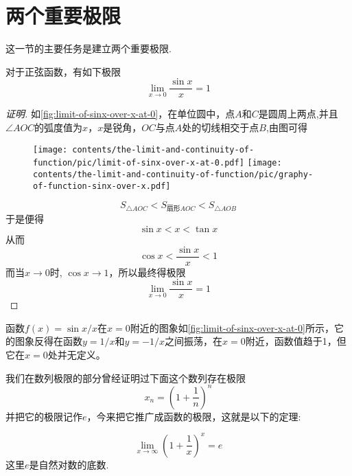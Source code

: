 
\section{两个重要极限}
\label{sec:two-import-function-limit}

这一节的主要任务是建立两个重要极限.

\begin{theorem}
  对于正弦函数，有如下极限
  \[ \lim_{x \to 0} \frac{\sin{x}}{x} = 1 \]
\end{theorem}

\begin{proof}[证明]

  如\autoref{fig:limit-of-sinx-over-x-at-0}，在单位圆中，点$A$和$C$是圆周上两点,并且$\angle AOC$的弧度值为$x$，$x$是锐角，$OC$与点$A$处的切线相交于点$B$,由图可得
  
\begin{figure}[htbp]
\centering
\texttt{[image: contents/the-limit-and-continuity-of-function/pic/limit-of-sinx-over-x-at-0.pdf]}
\texttt{[image: contents/the-limit-and-continuity-of-function/pic/graphy-of-function-sinx-over-x.pdf]}
\caption{}
\label{fig:limit-of-sinx-over-x-at-0}
\end{figure}

  \[ S_{\triangle AOC} < S_{\text{扇形}AOC} < S_{\triangle AOB} \]
  于是便得
  \[ \sin{x} < x < \tan{x} \]
  从而
  \[ \cos{x} < \frac{\sin{x}}{x} < 1 \]
  而当$x \to 0$时, $\cos{x} \to 1$，所以最终得极限
  \[ \lim_{x \to 0} \frac{\sin{x}}{x} = 1 \]
\end{proof}

函数$f(x)=\sin{x}/x$在$x=0$附近的图象如\autoref{fig:limit-of-sinx-over-x-at-0}所示，它的图象反得在函数$y=1/x$和$y=-1/x$之间振荡，在$x=0$附近，函数值趋于1，但它在$x=0$处并无定义。

我们在数列极限的部分曾经证明过下面这个数列存在极限
\[ x_n = \left( 1+\frac{1}{n} \right)^n \]
并把它的极限记作$e$，今来把它推广成函数的极限，这就是以下的定理:
\begin{theorem}
  \[ \lim_{x \to \infty} \left( 1+\frac{1}{x} \right)^x = e \]
  这里$e$是自然对数的底数.
\end{theorem}

